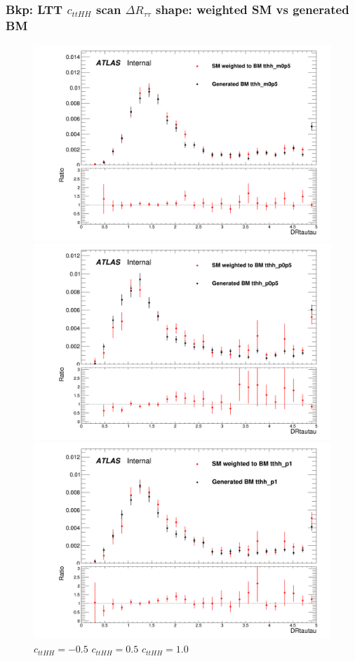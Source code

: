 \documentclass[twoside,11pt]{beamer}
\begin{document}
\begin{frame}
\frametitle{Bkp: LTT $c_{ttHH}$ scan $\Delta R_{\tau\tau}$ shape: weighted SM vs generated BM}
\begin{figure}
\includegraphics[width=.32\textwidth]{figures/Method_B_all_latest_LTT/BMtthh_m0p5h_DRtautau.png}
\includegraphics[width=.32\textwidth]{figures/Method_B_all_latest_LTT/BMtthh_p0p5h_DRtautau.png}
\includegraphics[width=.32\textwidth]{figures/Method_B_all_latest_LTT/BMtthh_p1h_DRtautau.png}
$c_{ttHH} = -0.5$ \hspace{5em} $c_{ttHH} = 0.5$\hspace{5em} $c_{ttHH} = 1.0$    
\end{figure}

\end{frame}   
\end{document}
